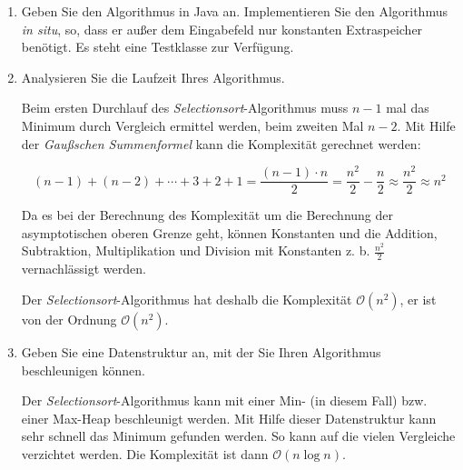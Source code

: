 \documentclass{bschlangaul-aufgabe}
\begin{document}
\begin{enumerate}


\item Geben Sie den Algorithmus in Java an.
Implementieren Sie den Algorithmus
\emph{in situ}, \dh so, dass er außer dem Eingabefeld nur konstanten
Extraspeicher benötigt. Es steht eine Testklasse zur Verfügung.

\begin{bAntwort}
\end{bAntwort}


\item Analysieren Sie die Laufzeit Ihres Algorithmus.

\begin{bAntwort}
Beim ersten Durchlauf des \emph{Selectionsort}-Algorithmus muss $n - 1$
mal das Minimum durch Vergleich ermittel werden, beim zweiten Mal
$n - 2$.
Mit Hilfe der \emph{Gaußschen Summenformel} kann die Komplexität
gerechnet werden:

\begin{displaymath}
(n-1)+(n-2)+\dotsb+3+2+1 =
\frac{(n-1)\cdot n}{2} =
\frac{n^2}{2}-\frac{n}{2} \approx
\frac{n^2}{2} \approx
n^2
\end{displaymath}

Da es bei der Berechnung des Komplexität um die Berechnung der
asymptotischen oberen Grenze geht, können Konstanten und die Addition,
Subtraktion, Multiplikation und Division mit Konstanten z. b.
$\frac{n^2}{2}$ vernachlässigt werden.

Der \emph{Selectionsort}-Algorithmus hat deshalb die Komplexität
$\mathcal{O}(n^2)$, er ist von der Ordnung
$\mathcal{O}(n^2)$.
\end{bAntwort}


\item Geben Sie eine Datenstruktur an, mit der Sie Ihren Algorithmus
beschleunigen können.

\begin{bAntwort}
Der \emph{Selectionsort}-Algorithmus kann mit einer Min- (in diesem
Fall) bzw. einer Max-Heap beschleunigt werden. Mit Hilfe dieser
Datenstruktur kann sehr schnell das Minimum gefunden werden. So kann auf
die vielen Vergleiche verzichtet werden. Die Komplexität ist dann
$\mathcal{O}(n \log n)$.
\end{bAntwort}
\end{enumerate}
\end{document}
